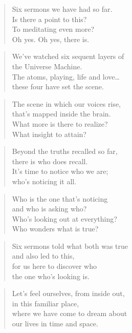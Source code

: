\documentclass[10pt,a4paper]{article}
\begin{document}
\begin{multicols}{2}


\begin{verse}
Six sermons we have had so far.\\
Is there a point to this?\\
To meditating even more?\\
Oh yes. Oh yes, there is.
\end{verse}

\begin{verse}
We’ve watched six sequent layers of\\
the Universe Machine.\\
The atoms, playing, life and love…\\
these four have set the scene.
\end{verse}

\begin{verse}
The scene in which our voices rise,\\
that’s mapped inside the brain.\\
What more is there to realize?\\
What insight to attain?
\end{verse}

\begin{verse}
Beyond the truths recalled so far,\\
there is who does recall.\\
It’s time to notice who we are;\\
who’s noticing it all.
\end{verse}

\begin{verse}
Who is the one that’s noticing\\
and who is asking who?\\
Who’s looking out at everything?\\
Who wonders what is true?
\end{verse}

\begin{verse}
Six sermons told what both was true\\
and also led to this,\\
for us here to discover who\\
the one who’s looking is.
\end{verse}

\begin{verse}
Let’s feel ourselves, from inside out,\\
in this familiar place,\\
where we have come to dream about\\
our lives in time and space.
\end{verse}


\end{multicols}
\end{document}
